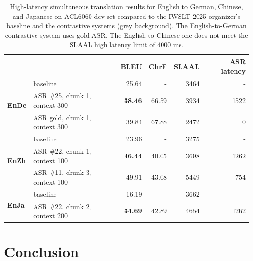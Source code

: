 \documentclass[11pt]{article}
\begin{document}
\begin{table}[]
    \centering
    \begin{tabular}{ll|rrr|r}
   &   & \textbf{BLEU} & \textbf{ChrF} & \textbf{SLAAL} & ASR latency \\
  \hline
\multirow{3}{*}{\textbf{EnDe}} & baseline        & 25.64 & - & 3464 & -\\
  & ASR \#25, chunk 1, context 300 & \textbf{38.46} & 66.59 & 3934 & 1522\\
& \cellcolor{lightgray}ASR gold, chunk 1, context 300 & \cellcolor{lightgray}39.84 & \cellcolor{lightgray}67.88 & \cellcolor{lightgray}2472 & \cellcolor{lightgray}0\\
 \hline
\multirow{3}{*}{\textbf{EnZh}} & baseline & 23.96 & - & 3275& -\\
 & ASR \#22, chunk 1, context 100 & \textbf{46.44} &  40.05 & 3698 & 1262\\
& \cellcolor{lightgray} 
 ASR \#11, chunk 3, context 100 & \cellcolor{lightgray}49.91 & \cellcolor{lightgray}43.08 & \cellcolor{lightgray}5449 & \cellcolor{lightgray}754 \\
 \hline
\multirow{2}{*}{\textbf{EnJa}}  &
 baseline & 16.19 & - & 3662 & - \\
& ASR \#22, chunk 2, context 200 & \textbf{34.69} & 42.89 & 4654 & 1262 \\
    
    \end{tabular}
    \caption{High-latency simultaneous translation results for English to German, Chinese, and Japanese on ACL6060 dev set compared to the IWSLT 2025 organizer's baseline and the contrastive systems (grey background).  The English-to-German contrastive system uses gold ASR. The English-to-Chinese one does not meet the SLAAL high latency limit of 4000 ms.}
    \label{tab:mt}
\end{table}






\section{Conclusion}

\end{document}
